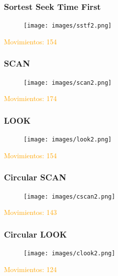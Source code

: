 \begin{frame}
  \frametitle{\textbf{Sortest Seek Time First}}
  \begin{figure}
    \texttt{[image: images/sstf2.png]}
  \end{figure}
  \hspace{35pt} \textcolor{orange}{Movimientos: 154}
\end{frame}

\begin{frame}
  \frametitle{\textbf{SCAN}}
  \begin{figure}
    \texttt{[image: images/scan2.png]}
  \end{figure}
  \hspace{35pt} \textcolor{orange}{Movimientos: 174}
\end{frame}

\begin{frame}
  \frametitle{\textbf{LOOK}}
  \begin{figure}
    \texttt{[image: images/look2.png]}
  \end{figure}
  \hspace{35pt} \textcolor{orange}{Movimientos: 154}
\end{frame}

\begin{frame}
  \frametitle{\textbf{Circular SCAN}}
  \begin{figure}
    \texttt{[image: images/cscan2.png]}
  \end{figure}
  \hspace{35pt} \textcolor{orange}{Movimientos: 143}
\end{frame}

\begin{frame}
  \frametitle{\textbf{Circular LOOK}}
  \begin{figure}
    \texttt{[image: images/clook2.png]}
  \end{figure}
  \hspace{35pt} \textcolor{orange}{Movimientos: 124}
\end{frame}

